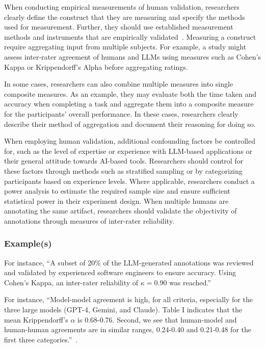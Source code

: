 When conducting empirical measurements of human validation, researchers \must clearly define the construct that they are measuring and \must specify the methods used for measurement. 
Further, they should use established measurement methods and instruments that are empirically validated~\cite{DBLP:journals/fcomp/HoffmanMKL23, DBLP:conf/chi/PerrigSB23}.
Measuring a construct \may require aggregating input from multiple subjects. 
For example, a study might assess inter-rater agreement of humans and LLMs using measures such as Cohen's Kappa or Krippendorff's Alpha before aggregating ratings.

In some cases, researchers can also combine multiple measures into single composite measures.
As an example, they may evaluate both the time taken and accuracy when completing a task and aggregate them into a composite measure for the participants' overall performance.
In these cases, researchers \should clearly describe their method of aggregation and document their reasoning for doing so.

When employing human validation, additional confounding factors \should be controlled for, such as the level of expertise or experience with LLM-based applications or their general attitude towards AI-based tools.
Researchers should control for these factors through methods such as stratified sampling or by categorizing participants based on experience levels.
Where applicable, researchers \should conduct a power analysis to estimate the required sample size and ensure sufficient statistical power in their experiment design.
When multiple humans are annotating the same artifact, researchers should validate the objectivity of annotations through measures of inter-rater reliability.

\subsubsection{Example(s)}

For instance, ``A subset of 20\% of the LLM-generated annotations was reviewed and validated by experienced software engineers to ensure accuracy. Using Cohen's Kappa, an inter-rater reliability of $\kappa = 0.90$ was reached.'' 

For instance, ``Model-model agreement is high, for all criteria, especially for the three large models (GPT-4, Gemini, and Claude). Table I indicates that the mean Krippendorff’s $\alpha$ is 0.68-0.76. 
Second, we see that human-model and human-human agreements are in similar ranges, 0.24-0.40 and 0.21-0.48
for the first three categories.''~\cite{DBLP:journals/corr/abs-2408-05534}.


